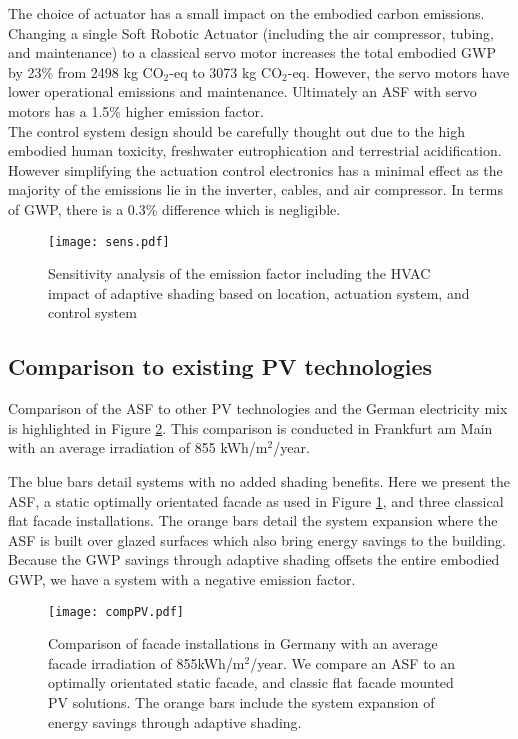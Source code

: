 The choice of actuator has a small impact on the embodied carbon emissions. Changing a single Soft Robotic Actuator (including the air compressor, tubing, and maintenance) to a classical servo motor increases the total embodied GWP by 23\% from 2498 kg CO$_{2}$-eq to 3073 kg CO$_{2}$-eq. However, the servo motors have lower operational emissions and maintenance. Ultimately an ASF with servo motors has a 1.5\% higher emission factor. \\


The control system design should be carefully thought out due to the high embodied human toxicity, freshwater eutrophication and terrestrial acidification. However simplifying the actuation control electronics has a minimal effect as the majority of the emissions lie in the inverter, cables, and air compressor. In terms of GWP, there is a 0.3\% difference which is negligible.



\begin{figure}[H]
\begin{center}
\texttt{[image: sens.pdf]}
\caption{Sensitivity analysis of the emission factor including the HVAC impact of adaptive shading based on location, actuation system, and control system}
\label{fig:sens}
\end{center}
\end{figure}

\subsection{Comparison to existing PV technologies}

Comparison of the ASF to other PV technologies and the German electricity mix is highlighted in Figure \ref{fig:compPV}. This comparison is conducted in Frankfurt am Main with an average irradiation of 855 kWh/m$^2$/year.\

The blue bars detail systems with no added shading benefits. Here we present the ASF, a static optimally orientated facade as used in Figure \ref{fig:sens}, and three classical flat facade installations.  
The orange bars detail the system expansion where the ASF is built over glazed surfaces which also bring energy savings to the building. Because the GWP savings through adaptive shading offsets the entire embodied GWP, we have a system with a negative emission factor.





\begin{figure}[H]
\begin{center}
\texttt{[image: compPV.pdf]}
\caption{Comparison of facade installations in Germany with an average facade irradiation of 855kWh/m$^2$/year.
We compare an ASF to an optimally orientated static facade, and classic flat facade mounted PV solutions. The orange bars include the system expansion of energy savings through adaptive shading.}
\label{fig:compPV}
\end{center}
\end{figure}

